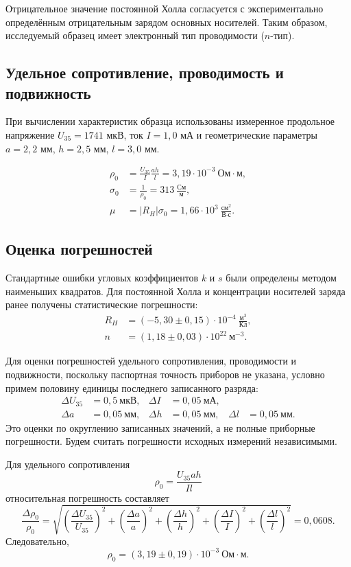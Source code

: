 \documentclass[12pt,a4paper]{article}
\begin{document}
Отрицательное значение постоянной Холла согласуется с
экспериментально определённым отрицательным зарядом основных
носителей. Таким образом, исследуемый образец имеет электронный
тип проводимости ($n$-тип).

\subsection{Удельное сопротивление, проводимость и подвижность}
При вычислении характеристик образца использованы измеренное
продольное напряжение $U_{35}=1741$ мкВ, ток $I=1{,}0$ мА
и геометрические параметры $a=2{,}2$ мм, $h=2{,}5$ мм,
$l=3{,}0$ мм.


\begin{align}
 \rho_0 &=\frac{U_{35}}{I}\frac{ah}{l}=3{,}19\cdot10^{-3}\ \text{Ом}\cdot\text{м},\\
 \sigma_0 &=\frac{1}{\rho_0}=313\ \frac{\text{См}}{\text{м}},\\
 \mu &=|R_H|\sigma_0=1{,}66\cdot10^{3}\ \frac{\text{см}^2}{\text{В}\cdot\text{с}}.
\end{align}

\subsection{Оценка погрешностей}

Стандартные ошибки угловых коэффициентов $k$ и $s$ были
определены методом наименьших квадратов. Для постоянной Холла
и концентрации носителей заряда ранее получены статистические
погрешности:
\begin{align}
 R_H &=(-5{,}30\pm0{,}15)\cdot10^{-4}\
       \frac{\text{м}^3}{\text{Кл}},\\
 n &=(1{,}18\pm0{,}03)\cdot10^{22}\ \text{м}^{-3}.
\end{align}

Для оценки погрешностей удельного сопротивления,
проводимости и подвижности, поскольку паспортная точность
приборов не указана, условно примем половину единицы
последнего записанного разряда:
\begin{align*}
 \Delta U_{35}&=0{,}5\ \text{мкВ},&
 \Delta I&=0{,}05\ \text{мА},\\
 \Delta a&=0{,}05\ \text{мм},&
 \Delta h&=0{,}05\ \text{мм},&
 \Delta l&=0{,}05\ \text{мм}.
\end{align*}
Это оценки по округлению записанных значений, а не полные
приборные погрешности. Будем считать погрешности исходных
измерений независимыми.

Для удельного сопротивления
\begin{equation}
 \rho_0=\frac{U_{35}ah}{Il}
\end{equation}
относительная погрешность составляет
\begin{equation}
 \frac{\Delta\rho_0}{\rho_0}=
 \sqrt{
 \left(\frac{\Delta U_{35}}{U_{35}}\right)^2+
 \left(\frac{\Delta a}{a}\right)^2+
 \left(\frac{\Delta h}{h}\right)^2+
 \left(\frac{\Delta I}{I}\right)^2+
 \left(\frac{\Delta l}{l}\right)^2
 }
 =0{,}0608.
\end{equation}
Следовательно,
\begin{equation}
 \rho_0=(3{,}19\pm0{,}19)\cdot10^{-3}\
         \text{Ом}\cdot\text{м}.
\end{equation}
\end{document}
